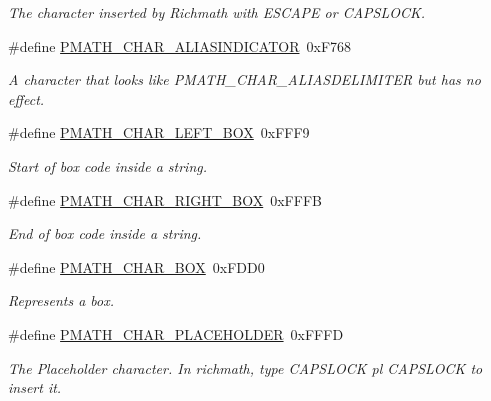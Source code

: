 \begin{CompactItemize}
\begin{CompactList}\small\item\em The character inserted by Richmath with ESCAPE or CAPSLOCK. \item\end{CompactList}\item 
\hypertarget{group__parser_ga9a5a4bbece31aec4a25b94617ffd2e4}{
\#define \hyperlink{group__parser_ga9a5a4bbece31aec4a25b94617ffd2e4}{PMATH\_\-CHAR\_\-ALIASINDICATOR}~0xF768}
\label{group__parser_ga9a5a4bbece31aec4a25b94617ffd2e4}

\begin{CompactList}\small\item\em A character that looks like PMATH\_\-CHAR\_\-ALIASDELIMITER but has no effect. \item\end{CompactList}\item 
\hypertarget{group__parser_g50754cd7c2add678bdf9c38fbf718876}{
\#define \hyperlink{group__parser_g50754cd7c2add678bdf9c38fbf718876}{PMATH\_\-CHAR\_\-LEFT\_\-BOX}~0xFFF9}
\label{group__parser_g50754cd7c2add678bdf9c38fbf718876}

\begin{CompactList}\small\item\em Start of box code inside a string. \item\end{CompactList}\item 
\hypertarget{group__parser_gbe190a67cf1ce921b90525f37447dee5}{
\#define \hyperlink{group__parser_gbe190a67cf1ce921b90525f37447dee5}{PMATH\_\-CHAR\_\-RIGHT\_\-BOX}~0xFFFB}
\label{group__parser_gbe190a67cf1ce921b90525f37447dee5}

\begin{CompactList}\small\item\em End of box code inside a string. \item\end{CompactList}\item 
\hypertarget{group__parser_g0898bea51a58cb7ea2b06f17712e08f6}{
\#define \hyperlink{group__parser_g0898bea51a58cb7ea2b06f17712e08f6}{PMATH\_\-CHAR\_\-BOX}~0xFDD0}
\label{group__parser_g0898bea51a58cb7ea2b06f17712e08f6}

\begin{CompactList}\small\item\em Represents a box. \item\end{CompactList}\item 
\hypertarget{group__parser_g53235db72e40994196d096cce0569a55}{
\#define \hyperlink{group__parser_g53235db72e40994196d096cce0569a55}{PMATH\_\-CHAR\_\-PLACEHOLDER}~0xFFFD}
\label{group__parser_g53235db72e40994196d096cce0569a55}

\begin{CompactList}\small\item\em The Placeholder character. In richmath, type CAPSLOCK pl CAPSLOCK to insert it. \item\end{CompactList}\end{CompactItemize}

